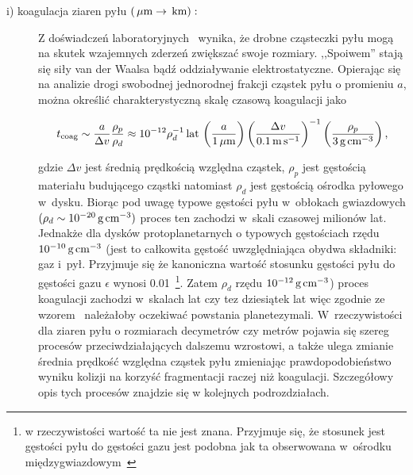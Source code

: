 \begin{description}
   \item[i) koagulacja ziaren pyłu $\left(\hbox{$\thinspace\mu\textrm{m}$} \rightarrow \hbox{$\thinspace\textrm{km}$}\right):$] 
      Z doświadczeń laboratoryjnych~\cite{BW08} wynika, że drob\-ne cząsteczki pyłu
      mogą na skutek wzajemnych zderzeń zwiększać swoje rozmiary. ,,Spoiwem'' stają
      się siły van der Waalsa bądź oddziaływanie elektrostatyczne. Opierając się
      na analizie drogi swobodnej jednorodnej frakcji cząstek pyłu o promieniu
      $a$, można określić charakterystyczną skalę czasową koagulacji jako 

   \begin{equation}\label{coag} 
      t_{\textrm{coag}} %
      \sim \frac{a}{\Delta v}\frac{\rho_p}{\rho_d} \approx 
      10^{-12} \rho_d^{-1}\yr\thinspace
      \left(\frac{a}{1\mum}\right)
      \left(\frac{\Delta v}{0.1\m\s^{-1}}\right)^{-1}
      \left(\frac{\rho_p}{3\g\cm^{-3}}\right),
   \end{equation}

   gdzie $\Delta v$ jest średnią prędkością względna cząstek, $\rho_p$ jest
   gęstością materiału budującego cząstki natomiast $\rho_d$ jest gęstością
   ośrodka pyłowego w~dysku.  Biorąc pod uwagę typowe gęstości pyłu w~obłokach
   gwiazdowych $(\rho_d \sim 10^{-20}\hbox{$\thinspace\textrm{g}$}\hbox{$\thinspace\textrm{cm}$}^{-3})$ proces ten zachodzi w~skali
   czasowej milionów lat. Jednakże dla dysków protoplanetarnych o typowych
   gęstościach rzędu $10^{-10}\hbox{$\thinspace\textrm{g}$}\hbox{$\thinspace\textrm{cm}$}^{-3}$ (jest to całkowita gęstość
   uwzględniająca obydwa składniki: gaz i~pył. Przyjmuje się że kanoniczna
   wartość stosunku gęstości pyłu do gęstości gazu $\epsilon$ wynosi
   0.01~\footnote{w rzeczywistości wartość ta nie jest znana. Przyjmuje się, że
   stosunek jest gęstości pyłu do gęstości gazu jest podobna jak ta obserwowana
   w~ośrodku międzygwiazdowym~\cite{FS03}}. Zatem $\rho_d$ rzędu
   $10^{-12}\hbox{$\thinspace\textrm{g}$}\hbox{$\thinspace\textrm{cm}$}^{-3}$) proces koagulacji zachodzi w~skalach lat czy tez
   dziesiątek lat więc zgodnie ze wzorem~ należałoby oczekiwać
   powstania planetezymali. W~rzeczywistości dla ziaren pyłu o rozmiarach
   decymetrów czy metrów pojawia się szereg procesów przeciwdziałających
   dalszemu wzrostowi, a także ulega zmianie średnia prędkość względna cząstek
   pyłu zmieniając prawdopodobieństwo wyniku kolizji na korzyść fragmentacji
   raczej niż koagulacji. Szczegółowy opis tych procesów znajdzie się w
   kolejnych podrozdziałach.


\end{description}
